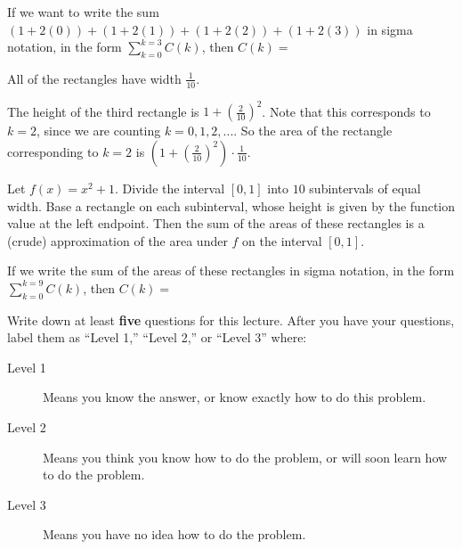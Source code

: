 \documentclass{ximera}
\begin{document}
\begin{question}
  If we want to write the sum $(1+2(0))+(1+2(1))+(1+2(2))+(1+2(3))$ in
  sigma notation, in the form $\displaystyle\sum_{k=0}^{k=3} C(k)$, then
  $C(k)=$
\end{question}

\begin{question}
  \begin{hint}
    All of the rectangles have width $\frac{1}{10}$.
  \end{hint}
  \begin{hint}
    The height of the third rectangle is $1+(\frac{2}{10})^2$.  Note that this corresponds to $k=2$, since we are counting $k=0,1,2,...$.  So the area of the rectangle corresponding to $k=2$ is $(1+(\frac{2}{10})^2) \cdot \frac{1}{10}$.
  \end{hint}
  Let $f(x) = x^2+1$.  Divide the interval $[0,1]$ into $10$ subintervals of equal width.  Base a rectangle on each subinterval, whose height is given by the function value at the left endpoint.  Then the sum of the areas of these rectangles is a (crude) approximation of the area under $f$ on the interval $[0,1]$.
	
\begin{image}
\end{image}
	
  If we write the sum of the areas of these rectangles in sigma notation, in the form $\displaystyle \sum_{k=0}^{k=9} C(k)$, then $C(k) = $
\end{question}


\begin{question}
Write down at least \textbf{five} questions for this lecture. After
you have your questions, label them as ``Level 1,'' ``Level 2,'' or ``Level 3'' where:
\begin{description}
\item[Level 1] Means you know the answer, or know exactly how to do this problem.
\item[Level 2] Means you think you know how to do the problem, or will soon learn how to do the problem.
\item[Level 3] Means you have no idea how to do the problem. 
\end{description}
  \begin{freeResponse}
  \end{freeResponse}
\end{question}
\end{document}
